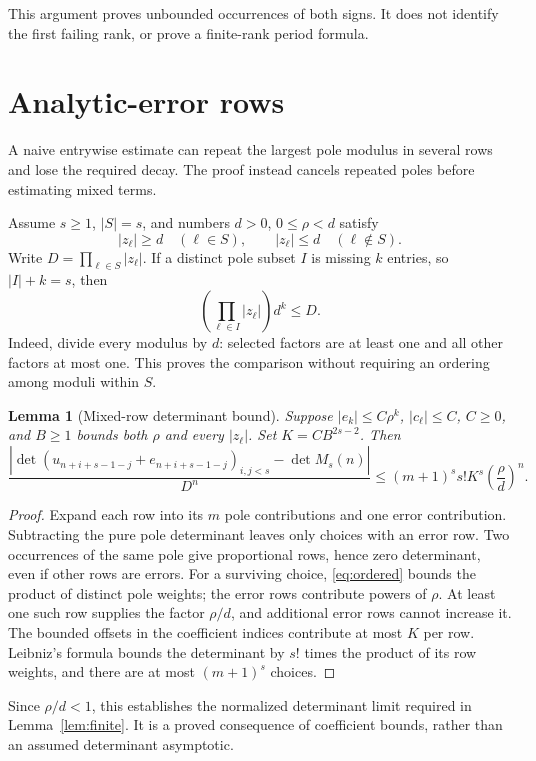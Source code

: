 \documentclass[11pt]{amsart}
\newtheorem{lemma}[theorem]{Lemma}
\begin{document}
This argument proves unbounded occurrences of both signs. It does not identify the first failing rank, or prove a finite-rank period formula.

\section{Analytic-error rows}
A naive entrywise estimate can repeat the largest pole modulus in several rows and lose the required decay. The proof instead cancels repeated poles before estimating mixed terms.

Assume $s\ge1$, $|S|=s$, and numbers $d>0$, $0\le\rho<d$ satisfy
\[
 |z_\ell|\ge d\quad(\ell\in S),\qquad
 |z_\ell|\le d\quad(\ell\notin S).
\]
Write $D=\prod_{\ell\in S}|z_\ell|$. If a distinct pole subset $I$ is missing $k$ entries, so $|I|+k=s$, then
\begin{equation}\label{eq:ordered}
 \left(\prod_{\ell\in I}|z_\ell|\right)d^k\le D.
\end{equation}
Indeed, divide every modulus by $d$: selected factors are at least one and all other factors at most one. This proves the comparison without requiring an ordering among moduli within $S$.

\begin{lemma}[Mixed-row determinant bound]\label{lem:mixed}
Suppose $|e_k|\le C\rho^k$, $|c_\ell|\le C$, $C\ge0$, and
$B\ge1$ bounds both $\rho$ and every $|z_\ell|$. Set
$K=CB^{2s-2}$. Then
\[
 \frac{\left|\det(u_{n+i+s-1-j}+e_{n+i+s-1-j})_{i,j<s}
                   -\det M_s(n)\right|}{D^n}
 \le (m+1)^s s!K^s\left(\frac{\rho}{d}\right)^n.
\]
\end{lemma}

\begin{proof}
Expand each row into its $m$ pole contributions and one error contribution. Subtracting the pure pole determinant leaves only choices with an error row. Two occurrences of the same pole give proportional rows, hence zero determinant, even if other rows are errors. For a surviving choice, \eqref{eq:ordered} bounds the product of distinct pole weights; the error rows contribute powers of $\rho$. At least one such row supplies the factor $\rho/d$, and additional error rows cannot increase it. The bounded offsets in the coefficient indices contribute at most $K$ per row. Leibniz's formula bounds the determinant by $s!$ times the product of its row weights, and there are at most $(m+1)^s$ choices.
\end{proof}

Since $\rho/d<1$, this establishes the normalized determinant limit required in Lemma~\ref{lem:finite}. It is a proved consequence of coefficient bounds, rather than an assumed determinant asymptotic.
\end{document}
